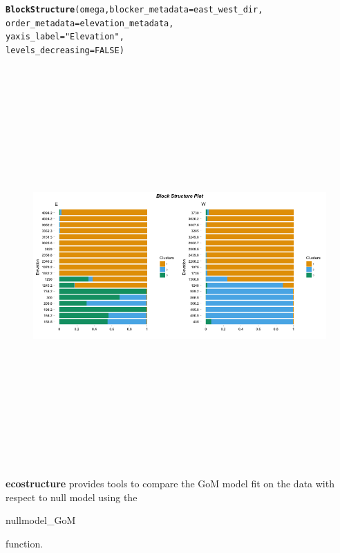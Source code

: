 \documentclass[12pt]{article}\usepackage[]{graphicx}\usepackage[usenames,dvipsnames]{color}
\makeatletter
\newcommand{\hlnum}[1]{\textcolor[rgb]{0.686,0.059,0.569}{#1}}%
\newcommand{\hlstr}[1]{\textcolor[rgb]{0.192,0.494,0.8}{#1}}%
\newcommand{\hlstd}[1]{\textcolor[rgb]{0.345,0.345,0.345}{#1}}%
\newcommand{\hlkwc}[1]{\textcolor[rgb]{0.333,0.667,0.333}{#1}}%
\newcommand{\hlkwd}[1]{\textcolor[rgb]{0.737,0.353,0.396}{\textbf{#1}}}%
\newenvironment{kframe}{%
 \def\at@end@of@kframe{}%
 \ifinner\ifhmode%
  \def\at@end@of@kframe{\end{minipage}}%
  \begin{minipage}{\columnwidth}%
 \fi\fi%
 \def\FrameCommand##1{\hskip\@totalleftmargin \hskip-\fboxsep
 \colorbox{shadecolor}{##1}\hskip-\fboxsep
     \hskip-\linewidth \hskip-\@totalleftmargin \hskip\columnwidth}%
 \MakeFramed {\advance\hsize-\width
   \@totalleftmargin\z@ \linewidth\hsize
   \@setminipage}}%
 {\par\unskip\endMakeFramed%
 \at@end@of@kframe}
\newenvironment{knitrout}{}{} %
\makeatother
\begin{document}
\begin{knitrout}
\color{fgcolor}\begin{kframe}
\begin{alltt}
\hlkwd{BlockStructure}\hlstd{(omega,} \hlkwc{blocker_metadata} \hlstd{= east_west_dir,}
               \hlkwc{order_metadata} \hlstd{= elevation_metadata,}
               \hlkwc{yaxis_label} \hlstd{=} \hlstr{"Elevation"}\hlstd{,}
               \hlkwc{levels_decreasing} \hlstd{=} \hlnum{FALSE}\hlstd{)}
\end{alltt}
\end{kframe}
\end{knitrout}


\begin{figure}[htp]
\begin{center}
\includegraphics[width=6in,height=6in]{figure/block_structure.png}
\end{center}
\end{figure}

\newpage

\textbf{ecostructure} provides tools to compare the GoM model fit on the data with respect to null model using the \begin{verb} nullmodel_GoM \end{verb} function.
\end{document}

